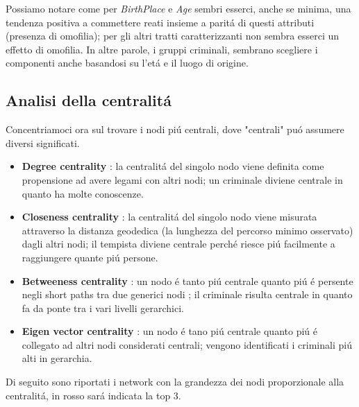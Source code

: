 \documentclass[11pt,a4paper]{report}
\begin{document}
Possiamo notare come per \emph{BirthPlace} e \emph{Age} sembri esserci, anche se minima, una tendenza positiva a commettere reati insieme a parit\'a di questi attributi (presenza di omofilia); per gli altri tratti caratterizzanti non sembra esserci un effetto di omofilia. In altre parole, i gruppi criminali, sembrano scegliere i componenti anche basandosi su l'et\'a e il luogo di origine.
\subsection{Analisi della centralit\'a}
Concentriamoci ora sul trovare i nodi pi\'u centrali, dove "centrali" pu\'o assumere diversi significati.
\\
\begin{itemize}
	\item  \textbf{Degree centrality } : la centralit\'a del singolo nodo viene definita come propensione ad avere legami con altri nodi; un criminale diviene centrale in quanto ha molte conoscenze.
	\item  \textbf{Closeness centrality } : la centralit\'a del singolo nodo viene misurata attraverso la distanza geodedica (la lunghezza del percorso minimo osservato) dagli altri nodi; il tempista diviene centrale perch\'e riesce pi\'u facilmente a raggiungere quante pi\'u persone.
	\item  \textbf{Betweeness centrality } : un nodo \'e tanto pi\'u centrale quanto pi\'u \'e persente negli short paths tra due generici nodi ; il criminale risulta centrale in quanto fa da ponte tra i vari livelli gerarchici.
	\item  \textbf{Eigen vector centrality } : un nodo \'e tano pi\'u centrale quanto pi\'u \'e collegato ad altri nodi considerati centrali; vengono identificati i criminali pi\'u alti in gerarchia.	
\end{itemize}
Di seguito sono riportati i network con la grandezza dei nodi proporzionale alla centralit\'a, in rosso sar\'a indicata la top 3.
\end{document}
